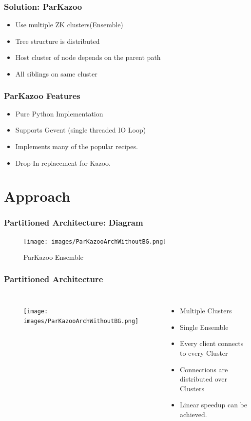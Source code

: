 \documentclass[10pt, compress]{beamer}
\begin{document}
\begin{frame}[fragile]
    \frametitle{Solution: ParKazoo}
    \begin{itemize}
        \item Use multiple ZK clusters(Ensemble)
        \item Tree structure is distributed
        \item Host cluster of node depends on the parent path
        \item All siblings on same cluster
    \end{itemize}
\end{frame}

\begin{frame}
    \frametitle{ParKazoo Features}
    \begin{itemize}
        \item Pure Python Implementation
        \item Supports Gevent (single threaded IO Loop)
        \item Implements many of the popular recipes.
        \item Drop-In replacement for Kazoo.
    \end{itemize}
\end{frame}

\section{Approach}
\begin{frame}[fragile]
    \frametitle{Partitioned Architecture: Diagram}
    \begin{figure}[ht!]
        \centering
        \texttt{[image: images/ParKazooArchWithoutBG.png]}
        \caption{ParKazoo Ensemble \label{overflow}}
    \end{figure}
\end{frame}

\begin{frame}[fragile]
    \frametitle{Partitioned Architecture}
    \begin{columns}[onlytextwidth]
            \begin{figure}[ht!]
                \centering
                \texttt{[image: images/ParKazooArchWithoutBG.png]}
            \end{figure}
            \begin{itemize}
                \item Multiple Clusters
                \item Single Ensemble
                \item Every client connects to every Cluster
                \item Connections are distributed over Clusters
                \item Linear speedup can be achieved.
            \end{itemize}
    \end{columns}
\end{frame}
\end{document}
